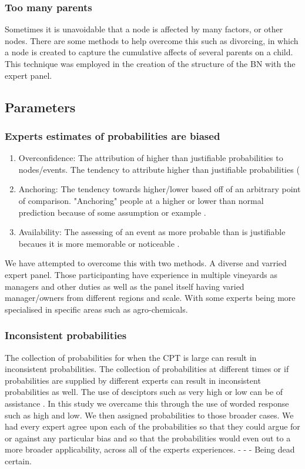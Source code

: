 \subsubsection{Too many parents}
Sometimes it is unavoidable that a node is affected by many factors, or other nodes. There are some methods to help overcome this such as divorcing, in which a node is created to capture the cumulative affects of several parents on a child. This technique was employed in the creation of the structure of the BN with the expert panel.

\subsection{Parameters}
\subsubsection{Experts estimates of probabilities are biased}
\begin{enumerate}
        \item Overconfidence: The attribution of higher than justifiable probabilities to nodes/events.
        \indent The tendency to attribute higher than justifiable probabilities (\citep{lichtensteinCalibrationProbabilitiesState1982} 
        \item Anchoring: The tendency towards higher/lower based off of an arbitrary point of comparison. "Anchoring" people at a higher or lower than normal prediction because of some assumption or example  \citep{kahnemanPsychologyPrediction1973}.
        \item Availability: The assessing of an event as more probable than is justifiable becaues it is more memorable or noticeable \citep{tverskyJudgmentUncertaintyHeuristics1974}.

\end{enumerate}
We have attempted to overcome this with two methods. A diverse and varried expert panel. Those participanting have experience in multiple vineyards as managers and other duties as well as the panel itself having varied manager/owners from different regions and scale. With some experts being more specialised in specific areas such as agro-chemicals.
\subsubsection{Inconsistent probabilities}
The collection of probabilities for when the CPT is large can result in inconsistent probabilities. The collection of probabilities at different times or if probabilities are supplied by different experts can result in inconsistent probabilities as well.
The use of desciptors such as very high or low can be of assistance \cite{vandergaag2013elicit}. In this study we overcame this through the use of worded response such as high and low. We then assigned probabilities to those broader cases. We had every expert agree upon each of the probabilities so that they could argue for or against any particular bias and so that the probabilities would even out to a more broader applicability, across all of the experts experiences.
-       -       - Being dead certain.
